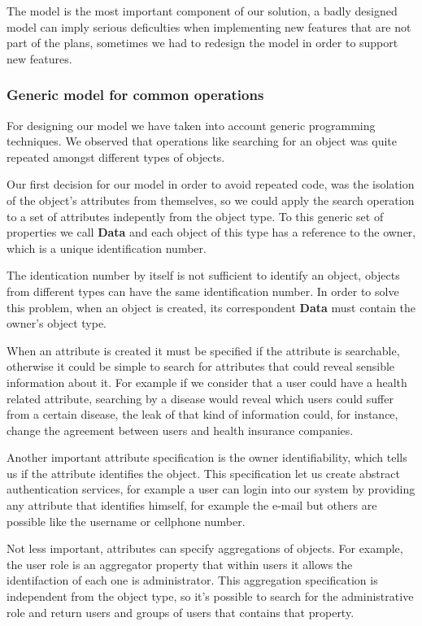 The model is the most important component of our solution, a badly designed model can imply serious deficulties when implementing new features that are not part of the plans, sometimes we had to redesign the model in order to support new features.

\subsubsection {Generic model for common operations}

For designing our model we have taken into account generic programming techniques. We observed that operations like searching for an object was quite repeated amongst different types of objects. 

Our first decision for our model in order to avoid repeated code, was the isolation of the object's attributes from themselves, so we could apply the search operation to a set of attributes indepently from the object type. To this generic set of properties we call \textbf{Data} and each object of this type has a reference to the owner, which is a unique identification number.

The identication number by itself is not sufficient to identify an object, objects from different types can have the same identification number. In order to solve this problem, when an object is created, its correspondent \textbf{Data} must contain the owner's object type. 

When an attribute is created it must be specified if the attribute is searchable, otherwise it could be simple to search for attributes that could reveal sensible information about it. For example if we consider that a user could have a health related attribute, searching by a disease would reveal which users could suffer from a certain disease, the leak of that kind of information could, for instance, change the agreement between users and health insurance companies.

Another important attribute specification is the owner identifiability, which tells us if the attribute identifies the object. This specification let us create abstract authentication services, for example a user can login into our system by providing any attribute that identifies himself, for example the e-mail but others are possible like the username or cellphone number. 

Not less important, attributes can specify aggregations of objects. For example, the user role is an aggregator property that within users it allows the identifaction of each one is administrator. This aggregation specification is independent from the object type, so it's possible to search for the administrative role and return users and groups of users that contains that property.

